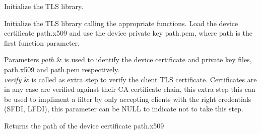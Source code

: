 Initialize the T\+LS library. 

Initialize the T\+LS library calling the appropriate functions. Load the device certificate \textquotesingle{}path\textquotesingle{}.x509 and use the device private key \textquotesingle{}path\textquotesingle{}.pem, where \textquotesingle{}path\textquotesingle{} is the first function parameter. 
\begin{DoxyParams}{Parameters}
{\em path} & is used to identify the device certificate and private key files, \textquotesingle{}path\textquotesingle{}.x509 and \textquotesingle{}path\textquotesingle{}.pem respectively. \\
\hline
{\em verify} & is called as extra step to verify the client T\+LS certificate. Certificates are in any case are verified against their CA certificate chain, this extra step this can be used to impliment a filter by only accepting clients with the right credentials (S\+F\+DI, L\+F\+DI), this parameter can be N\+U\+LL to indicate not to take this step. \\
\hline
\end{DoxyParams}
\begin{DoxyReturn}{Returns}
the path of the device certificate \textquotesingle{}path\textquotesingle{}.x509 
\end{DoxyReturn}
